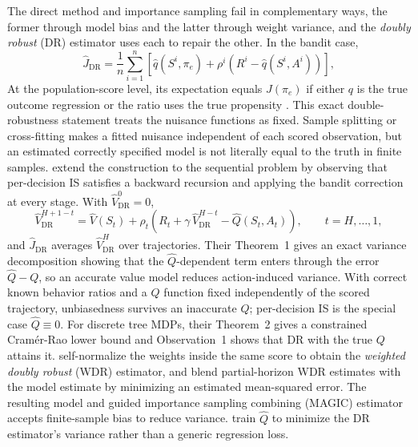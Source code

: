 The direct method and importance sampling fail in complementary ways, the former through model bias and the latter through weight variance, and the \emph{doubly robust} (DR) estimator uses each to repair the other. In the bandit case,
\begin{equation}
\hat{J}_{\mathrm{DR}} = \frac{1}{n} \sum_{i=1}^{n} \left[ \hat{q}(S^i, \pi_e) + \rho^i \left( R^i - \hat{q}(S^i, A^i) \right) \right],
\label{eq:ope_dr_bandit}
\end{equation}
At the population-score level, its expectation equals $J(\pi_e)$ if either $q$ is the true outcome regression or the ratio uses the true propensity \citep{dudik2014doubly}. This exact double-robustness statement treats the nuisance functions as fixed. Sample splitting or cross-fitting makes a fitted nuisance independent of each scored observation, but an estimated correctly specified model is not literally equal to the truth in finite samples. \citet{jiangli2016doubly} extend the construction to the sequential problem by observing that per-decision IS satisfies a backward recursion and applying the bandit correction at every stage. With $\hat{V}_{\mathrm{DR}}^{0} = 0$,
\begin{equation}
\hat{V}_{\mathrm{DR}}^{H+1-t} = \hat{V}(S_t) + \rho_t\!\left( R_t + \gamma\, \hat{V}_{\mathrm{DR}}^{H-t} - \hat{Q}(S_t, A_t) \right),
\qquad t = H, \ldots, 1,
\label{eq:ope_dr_seq}
\end{equation}
and $\hat{J}_{\mathrm{DR}}$ averages $\hat{V}_{\mathrm{DR}}^{H}$ over trajectories. Their Theorem~1 gives an exact variance decomposition showing that the $\hat{Q}$-dependent term enters through the error $\hat{Q} - Q$, so an accurate value model reduces action-induced variance. With correct known behavior ratios and a $Q$ function fixed independently of the scored trajectory, unbiasedness survives an inaccurate $Q$; per-decision IS is the special case $\hat{Q} \equiv 0$. For discrete tree MDPs, their Theorem~2 gives a constrained Cramér-Rao lower bound and Observation~1 shows that DR with the true $Q$ attains it. \citet{thomasBrunskill2016magic} self-normalize the weights inside the same score to obtain the \emph{weighted doubly robust} (WDR) estimator, and blend partial-horizon WDR estimates with the model estimate by minimizing an estimated mean-squared error. The resulting model and guided importance sampling combining (MAGIC) estimator accepts finite-sample bias to reduce variance. \citet{farajtabar2018mrdr} train $\hat{Q}$ to minimize the DR estimator's variance rather than a generic regression loss.

